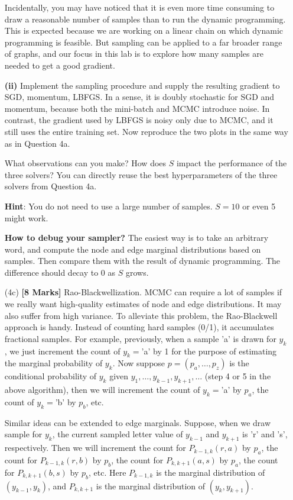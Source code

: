\documentclass[11pt]{report}
\begin{document}
\begin{itemize}
		Incidentally, you may have noticed that it is even more time consuming to draw a reasonable number of samples than to run the dynamic programming.
		This is expected because we are working on a linear chain on which dynamic programming is feasible.
		But sampling can be applied to a far broader range of graphs,
		and our focus in this lab is to explore how many samples are needed to get a good gradient.
		
		\textbf{(ii)} 
		Implement the sampling procedure and supply the resulting gradient to SGD, momentum, LBFGS.
		In a sense, it is doubly stochastic for SGD and momentum, because both the mini-batch and MCMC introduce noise. 
		In contrast, the gradient used by LBFGS is noisy only due to MCMC,
		and it still uses the entire training set.
		Now reproduce the two plots in the same way as in Question 4a.
		
		
		What observations can you make?  How does $S$ impact the performance of the three solvers?
		You can directly reuse the best hyperparameters of the three solvers from Question 4a.
		
		\textbf{Hint}: You do not need to use a large number of samples.  $S=10$ or even 5 might work.
		
		\textbf{How to debug your sampler?} The easiest way is to take an arbitrary word, and compute the node and edge marginal distributions based on samples.  Then compare them with the result of dynamic programming.  The difference should decay to 0 as $S$ grows.
		
		\item[(4c)] {\bf [8 Marks]} 
		Rao-Blackwellization. 
		MCMC can require a lot of samples if we really want high-quality estimates of node and edge distributions.
		It may also suffer from high variance.
		To alleviate this problem, the Rao-Blackwell approach is handy.
		Instead of counting hard samples (0/1), it accumulates fractional samples.
		For example, previously, when a sample 'a' is drawn for $y_k$, 
		we just increment the count of $y_k = $'a' by 1 for the purpose of estimating the marginal probability of $y_k$.
		Now suppose $p=(p_a, \ldots, p_z)$ is the conditional probability of $y_k$ given $y_1, \ldots, y_{k-1}, y_{k+1}, \ldots$ (step 4 or 5 in the above algorithm), then we will increment the count of $y_k = $'a' by $p_a$,
		the count of $y_k = $'b' by $p_b$, etc.
		
		Similar ideas can be extended to edge marginals.
		Suppose, when we draw sample for $y_k$, 
		the current sampled letter value of $y_{k-1}$ and $y_{k+1}$ is 'r' and 's', respectively.
		Then we will increment the count for $P_{k-1,k}(r, a)$ by $p_a$, 
		the count for $P_{k-1,k}(r, b)$ by $p_b$, 
		the count for $P_{k,k+1}(a, s)$ by $p_a$, 
		the count for $P_{k,k+1}(b, s)$ by $p_b$, 
		etc.
		Here $P_{k-1,k}$ is the marginal distribution of $(y_{k-1}, y_k)$,
		and $P_{k,k+1}$ is the marginal distribution of $(y_k, y_{k+1})$.
		

\end{itemize}
\end{document}
